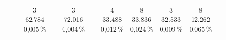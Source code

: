 \begin{table}[H]
{\begin{tabular}{lcccccccccc}
			                     & \shortstack{-                                                                                                                                                             \\ \,\\ \, }
			                     & \shortstack{3                                                                                                                                                             \\ 62.784 \\ 0,005\,\%}
			                     & \shortstack{-                                                                                                                                                             \\ \,\\ \, }
			                     & \shortstack{3                                                                                                                                                             \\ 72.016\\ 0,004\,\% }
			                     & \shortstack{-                                                                                                                                                             \\ \,\\ \, }
			                     & \shortstack{4                                                                                                                                                             \\ 33.488\\ 0,012\,\% }
			                     & \shortstack{8                                                                                                                                                             \\ 33.836\\ 0,024\,\% }
			                     & \shortstack{3                                                                                                                                                             \\ 32.533\\ 0,009\,\% }
			                     & \shortstack{8                                                                                                                                                             \\ 12.262\\ 0,065\,\% } \\

\end{tabular}}
\end{table}
